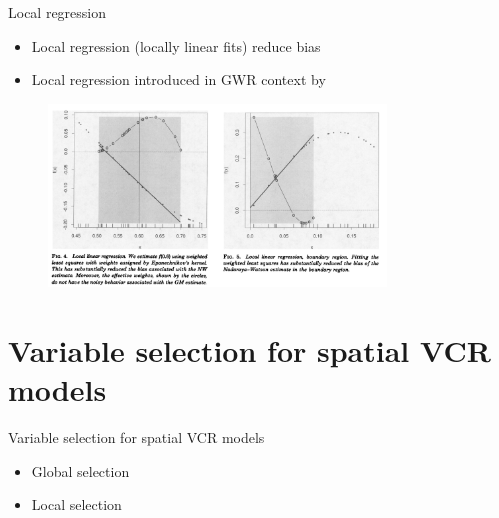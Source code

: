 \documentclass{beamer}
\begin{document}
    
    \begin{frame}{Local regression}      
        \begin{itemize}
            \item Local regression (locally linear fits) reduce bias
            \item Local regression introduced in GWR context by \cite{Wang:2008b}
        \end{itemize}  

        \begin{figure}
        \begin{center}
	  \includegraphics[width=0.8\textwidth]{../../figures/scratch/localregressionbias}
        \end{center}
        \end{figure}
    \end{frame}
    
    	


    \section{Variable selection for spatial VCR models}
    \begin{frame}{Variable selection for spatial VCR models}
        \begin{itemize}
            \item Global selection
            \item Local selection
        \end{itemize}
    \end{frame}
    
\end{document}
